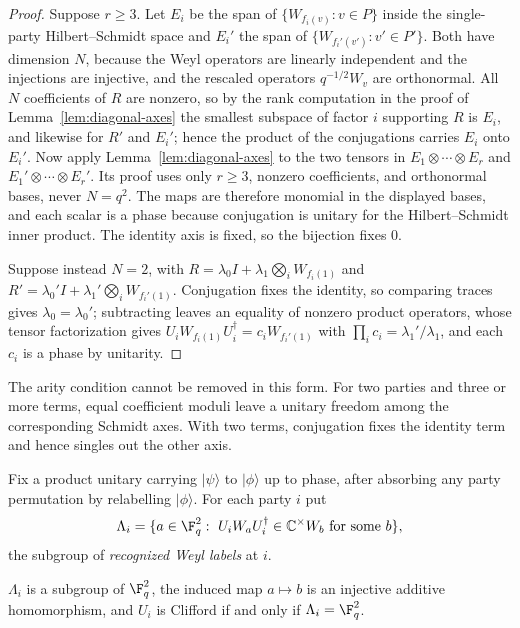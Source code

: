 \begin{proof}
Suppose \(r\geq3\).  Let \(E_i\) be the span of
\(\{W_{f_i(v)}:v\in P\}\) inside the single-party Hilbert--Schmidt space
and \(E_i'\) the span of \(\{W_{f_i'(v')}:v'\in P'\}\).  Both have
dimension \(N\), because the Weyl operators are linearly independent and
the injections are injective, and the rescaled operators
\(q^{-1/2}W_v\) are orthonormal.  All \(N\) coefficients of \(R\) are
nonzero, so by the rank computation in the proof of
Lemma~\ref{lem:diagonal-axes} the smallest subspace of factor \(i\)
supporting \(R\) is \(E_i\), and likewise for \(R'\) and \(E_i'\); hence
the product of the conjugations carries \(E_i\) onto \(E_i'\).  Now apply
Lemma~\ref{lem:diagonal-axes} to the two tensors in
\(E_1\otimes\cdots\otimes E_r\) and \(E_1'\otimes\cdots\otimes E_r'\).
Its proof uses only \(r\geq3\), nonzero coefficients, and orthonormal
bases, never \(N=q^2\).  The maps are therefore monomial in the displayed
bases, and each scalar is a phase because conjugation is unitary for the
Hilbert--Schmidt inner product.  The identity axis is fixed, so the
bijection fixes \(0\).

Suppose instead \(N=2\), with \(R=\lambda_0I+\lambda_1\bigotimes_iW_{f_i(1)}\)
and \(R'=\lambda_0'I+\lambda_1'\bigotimes_iW_{f_i'(1)}\).  Conjugation
fixes the identity, so comparing traces gives \(\lambda_0=\lambda_0'\);
subtracting leaves an equality of nonzero product operators, whose tensor
factorization gives
\(U_iW_{f_i(1)}U_i^\dagger=c_iW_{f_i'(1)}\) with \(\prod_ic_i=\lambda_1'/\lambda_1\),
and each \(c_i\) is a phase by unitarity.
\end{proof}

The arity condition cannot be removed in this form.  For two parties and
three or more terms, equal coefficient moduli leave a unitary freedom among
the corresponding Schmidt axes.  With two terms, conjugation fixes the
identity term and hence singles out the other axis.

Fix a product unitary carrying \(\lvert\psi\rangle\) to \(\lvert\phi\rangle\)
up to phase, after absorbing any party permutation by relabelling
\(\lvert\phi\rangle\).  For each party \(i\) put
\[
 \Lambda_i=\{a\in\F_q^2:\ U_iW_aU_i^\dagger\in\mathbb C^\times W_b
   \text{ for some }b\},
\]
the subgroup of \emph{recognized Weyl labels} at \(i\).

\begin{lemma}\label{lem:recognition-group}
\(\Lambda_i\) is a subgroup of \(\F_q^2\), the induced map \(a\mapsto b\)
is an injective additive homomorphism, and \(U_i\) is Clifford if and only
if \(\Lambda_i=\F_q^2\).
\end{lemma}

